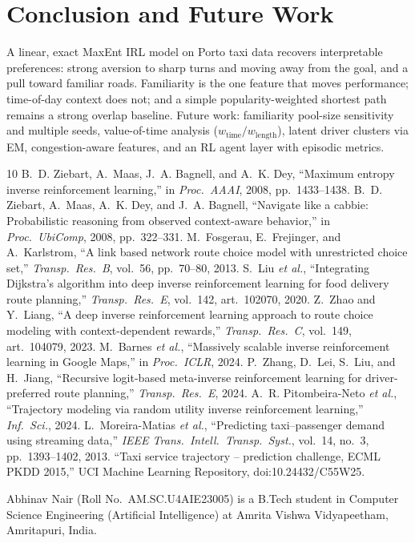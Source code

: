 \documentclass{ieeeaccess}
\begin{document}
\section{Conclusion and Future Work}
A linear, exact MaxEnt IRL model on Porto taxi data recovers interpretable preferences: strong aversion to sharp turns and moving away from the goal, and a pull toward familiar roads. Familiarity is the one feature that moves performance; time-of-day context does not; and a simple popularity-weighted shortest path remains a strong overlap baseline. Future work: familiarity pool-size sensitivity and multiple seeds, value-of-time analysis ($w_{\text{time}}/w_{\text{length}}$), latent driver clusters via EM, congestion-aware features, and an RL agent layer with episodic metrics. \EOD


\begin{thebibliography}{10}
 B.~D. Ziebart, A.~Maas, J.~A. Bagnell, and A.~K. Dey, ``Maximum entropy inverse reinforcement learning,'' in \emph{Proc.\ AAAI}, 2008, pp.~1433--1438.
 B.~D. Ziebart, A.~Maas, A.~K. Dey, and J.~A. Bagnell, ``Navigate like a cabbie: Probabilistic reasoning from observed context-aware behavior,'' in \emph{Proc.\ UbiComp}, 2008, pp.~322--331.
 M.~Fosgerau, E.~Frejinger, and A.~Karlstrom, ``A link based network route choice model with unrestricted choice set,'' \emph{Transp.\ Res.\ B}, vol.~56, pp.~70--80, 2013.
 S.~Liu \emph{et al.}, ``Integrating Dijkstra's algorithm into deep inverse reinforcement learning for food delivery route planning,'' \emph{Transp.\ Res.\ E}, vol.~142, art.~102070, 2020.
 Z.~Zhao and Y.~Liang, ``A deep inverse reinforcement learning approach to route choice modeling with context-dependent rewards,'' \emph{Transp.\ Res.\ C}, vol.~149, art.~104079, 2023.
 M.~Barnes \emph{et al.}, ``Massively scalable inverse reinforcement learning in Google Maps,'' in \emph{Proc.\ ICLR}, 2024.
 P.~Zhang, D.~Lei, S.~Liu, and H.~Jiang, ``Recursive logit-based meta-inverse reinforcement learning for driver-preferred route planning,'' \emph{Transp.\ Res.\ E}, 2024.
 A.~R. Pitombeira-Neto \emph{et al.}, ``Trajectory modeling via random utility inverse reinforcement learning,'' \emph{Inf.\ Sci.}, 2024.
 L.~Moreira-Matias \emph{et al.}, ``Predicting taxi--passenger demand using streaming data,'' \emph{IEEE Trans.\ Intell.\ Transp.\ Syst.}, vol.~14, no.~3, pp.~1393--1402, 2013.
 ``Taxi service trajectory -- prediction challenge, ECML PKDD 2015,'' UCI Machine Learning Repository, doi:10.24432/C55W25.
\end{thebibliography}
\begin{IEEEbiographynophoto}{Abhinav Nair}
(Roll No.\ AM.SC.U4AIE23005) is a B.Tech student in Computer Science Engineering (Artificial Intelligence) at Amrita Vishwa Vidyapeetham, Amritapuri, India.
\end{IEEEbiographynophoto}
\end{document}
